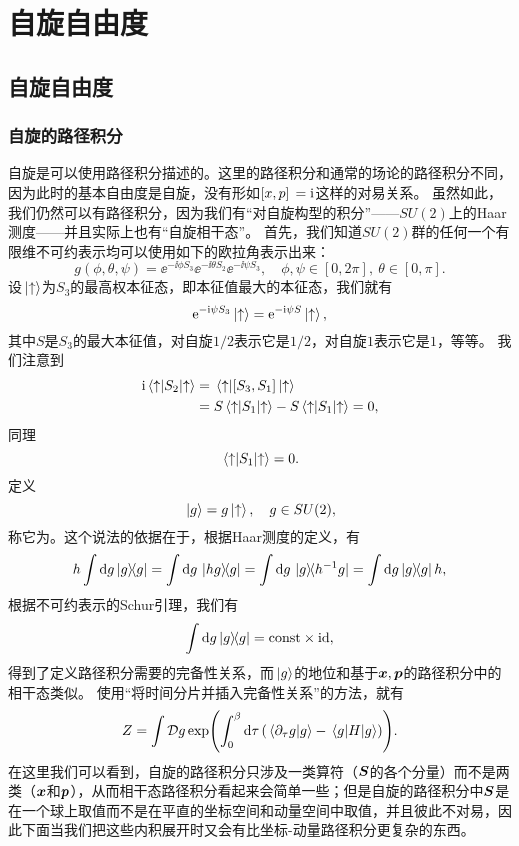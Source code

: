 \chapter{自旋自由度}

\section{自旋自由度}

\subsection{自旋的路径积分}

自旋是可以使用路径积分描述的。这里的路径积分和通常的场论的路径积分不同，因为此时的基本自由度是自旋，没有形如$\comm*{x}{p} = \ii$这样的对易关系。
虽然如此，我们仍然可以有路径积分，因为我们有“对自旋构型的积分”——$SU(2)$上的Haar测度——并且实际上也有“自旋相干态”。
首先，我们知道$SU(2)$群的任何一个有限维不可约表示均可以使用如下的欧拉角表示出来：
\begin{equation}
    g(\phi, \theta, \psi) = \ee^{- \ii \phi S_3} \ee^{- \ii \theta S_2} \ee^{- \ii \psi S_3}, \quad \phi, \psi \in [0, 2\pi], \ \theta \in [0, \pi].
\end{equation}
设$\ket*{\uparrow}$为$S_3$的最高权本征态，即本征值最大的本征态，我们就有
\begin{equation}
    \mathrm{e}^{- \mathrm{i} \psi S_3} \ket*{\uparrow} = \mathrm{e}^{- \mathrm{i} \psi S} \ket*{\uparrow},
\end{equation}
其中$S$是$S_3$的最大本征值，对自旋$1/2$表示它是$1/2$，对自旋$1$表示它是$1$，等等。
我们注意到
\[
    \begin{aligned}
        \ii \mel*{\uparrow}{S_2}{\uparrow} &= \mel*{\uparrow}{\comm*{S_3}{S_1}}{\uparrow} \\
        &= S \mel*{\uparrow}{S_1}{\uparrow} - S \mel*{\uparrow}{S_1}{\uparrow} = 0,
    \end{aligned}
\]
同理
\[
    \mel*{\uparrow}{S_1}{\uparrow} = 0.
\]
定义
\begin{equation}
    \ket*{g} = g \ket*{\uparrow}, \quad g \in SU(2),
\end{equation}
称它为。这个说法的依据在于，根据Haar测度的定义，有
\[
    h \int \dd{g} \dyad{g} = \int \dd{g} \dyad*{hg}{g} = \int \dd{g} \dyad*{g}{h^{-1} g} = \int \dd{g} \dyad{g} h, 
\]
根据不可约表示的Schur引理，我们有
\begin{equation}
    \int \dd{g} \dyad{g} = \const \times \mathrm{id}, 
\end{equation}
得到了定义路径积分需要的完备性关系，而$\ket*{g}$的地位和基于$\vb*{x}, \vb*{p}$的路径积分中的相干态类似。
使用“将时间分片并插入完备性关系”的方法，就有
\begin{equation}
    Z = \int \mathcal{D} g \exp(\int_0^\beta \dd{\tau} (\braket*{\partial_\tau g}{g} - \mel*{g}{H}{g})).
    \label{eq:spin-partition-original}
\end{equation}
在这里我们可以看到，自旋的路径积分只涉及一类算符（$\vb*{S}$的各个分量）而不是两类（$\vb*{x}$和$\vb*{p}$），从而相干态路径积分看起来会简单一些；但是自旋的路径积分中$\vb*{S}$是在一个球上取值而不是在平直的坐标空间和动量空间中取值，并且彼此不对易，因此下面当我们把这些内积展开时又会有比坐标-动量路径积分更复杂的东西。

